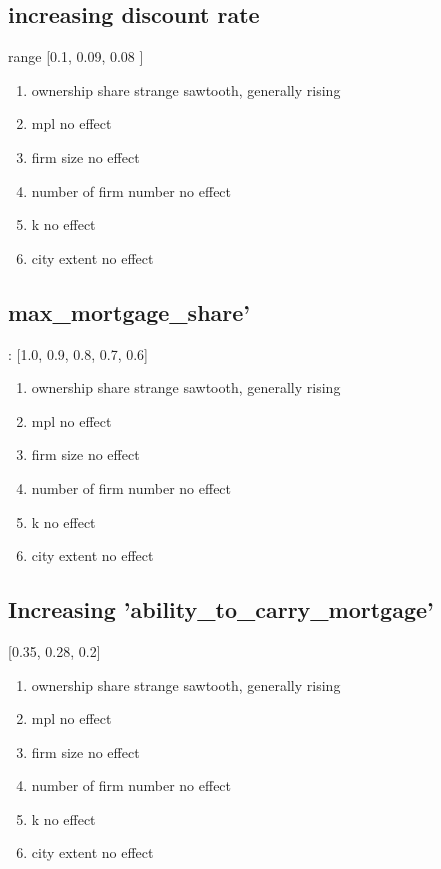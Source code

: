   

\subsection{increasing discount rate}  range [0.1, 0.09, 0.08 ]
    \begin{enumerate}
        \item ownership share  strange sawtooth, generally rising
        \item mpl     no effect              
        \item firm size       no effect         
        \item number of firm number no effect 
        \item k           no effect           
        \item city extent    no effect           
    \end{enumerate}

    
\subsection{ max\_mortgage\_share'}: [1.0, 0.9, 0.8, 0.7, 0.6]
    \begin{enumerate}
         \item ownership share  strange sawtooth, generally rising
        \item mpl     no effect              
        \item firm size       no effect         
        \item number of firm number no effect 
        \item k           no effect           
        \item city extent    no effect               
    \end{enumerate}


\subsection{Increasing 'ability\_to\_carry\_mortgage'} [0.35, 0.28, 0.2]
 
   \begin{enumerate}
         \item ownership share  strange sawtooth, generally rising
        \item mpl     no effect              
        \item firm size       no effect         
        \item number of firm number no effect 
        \item k           no effect           
        \item city extent    no effect  
     \end{enumerate}


